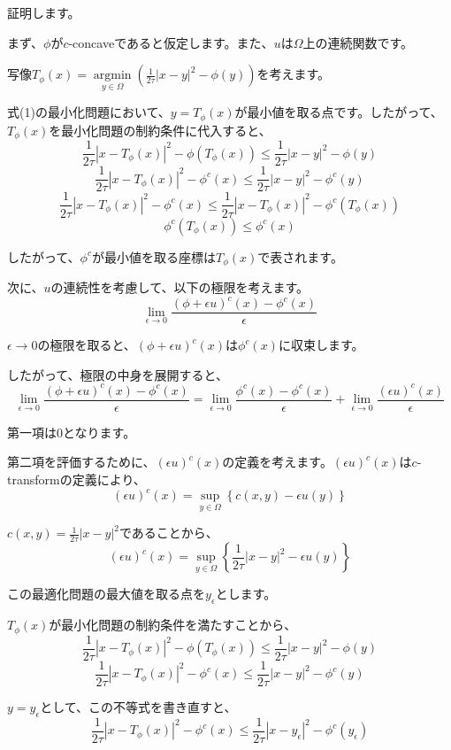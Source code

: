 \documentclass{jsarticle}
\theoremstyle{definition}
\begin{document}
証明します。

まず、$\phi$が$c$-concaveであると仮定します。また、$u$は$\Omega$上の連続関数です。

写像$T_\phi(x) = \underset{y \in \Omega}{\operatorname{argmin}}\left(\frac{1}{2 \tau} |x - y|^2 - \phi(y)\right)$を考えます。

式(1)の最小化問題において、$y = T_\phi(x)$が最小値を取る点です。したがって、$T_\phi(x)$を最小化問題の制約条件に代入すると、
$$\frac{1}{2 \tau} |x - T_\phi(x)|^2 - \phi(T_\phi(x)) \leq \frac{1}{2 \tau} |x - y|^2 - \phi(y)$$
$$\frac{1}{2 \tau} |x - T_\phi(x)|^2 - \phi^c(x) \leq \frac{1}{2 \tau} |x - y|^2 - \phi^c(y)$$
$$\frac{1}{2 \tau} |x - T_\phi(x)|^2 - \phi^c(x) \leq \frac{1}{2 \tau} |x - T_\phi(x)|^2 - \phi^c(T_\phi(x))$$
$$\phi^c(T_\phi(x)) \leq \phi^c(x)$$

したがって、$\phi^c$が最小値を取る座標は$T_\phi(x)$で表されます。

次に、$u$の連続性を考慮して、以下の極限を考えます。
$$\lim_{\epsilon \to 0} \frac{(\phi + \epsilon u)^c(x) - \phi^c(x)}{\epsilon}$$

$\epsilon \to 0$の極限を取ると、$(\phi + \epsilon u)^c(x)$は$\phi^c(x)$に収束します。

したがって、極限の中身を展開すると、
$$\lim_{\epsilon \to 0} \frac{(\phi + \epsilon u)^c(x) - \phi^c(x)}{\epsilon} = \lim_{\epsilon \to 0} \frac{\phi^c(x) - \phi^c(x)}{\epsilon} + \lim_{\epsilon \to 0} \frac{(\epsilon u)^c(x)}{\epsilon}$$

第一項は$0$となります。

第二項を評価するために、$(\epsilon u)^c(x)$の定義を考えます。$(\epsilon u)^c(x)$は$c$-transformの定義により、
$$(\epsilon u)^c(x) = \sup_{y \in \Omega}\left\{c(x, y) - \epsilon u(y)\right\}$$

$c(x, y) = \frac{1}{2 \tau} |x - y|^2$であることから、
$$(\epsilon u)^c(x) = \sup_{y \in \Omega}\left\{\frac{1}{2 \tau} |x - y|^2 - \epsilon u(y)\right\}$$

この最適化問題の最大値を取る点を$y_\epsilon$とします。

$T_\phi(x)$が最小化問題の制約条件を満たすことから、
$$\frac{1}{2 \tau} |x - T_\phi(x)|^2 - \phi(T_\phi(x)) \leq \frac{1}{2 \tau} |x - y|^2 - \phi(y)$$
$$\frac{1}{2 \tau} |x - T_\phi(x)|^2 - \phi^c(x) \leq \frac{1}{2 \tau} |x - y|^2 - \phi^c(y)$$

$y = y_\epsilon$として、この不等式を書き直すと、
$$\frac{1}{2 \tau} |x - T_\phi(x)|^2 - \phi^c(x) \leq \frac{1}{2 \tau} |x - y_\epsilon|^2 - \phi^c(y_\epsilon)$$
\end{document}
